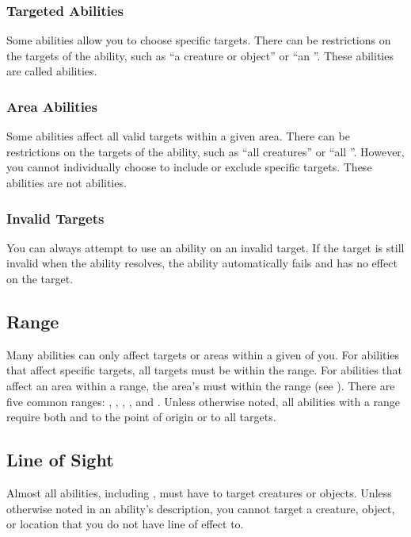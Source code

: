         \subsubsection{Targeted Abilities}\label{Targeted Abilities}
            Some abilities allow you to choose specific targets.
            There can be restrictions on the targets of the ability, such as ``a creature or object'' or ``an ''.
            These abilities are called  abilities.

        \subsubsection{Area Abilities}
            Some abilities affect all valid targets within a given area.
            There can be restrictions on the targets of the ability, such as ``all creatures'' or ``all ''.
            However, you cannot individually choose to include or exclude specific targets.
            These abilities are not  abilities.

        \subsubsection{Invalid Targets}
            You can always attempt to use an ability on an invalid target.
            If the target is still invalid when the ability resolves, the ability automatically fails and has no effect on the target.

    \subsection{Range}\label{Range}
        Many abilities can only affect targets or areas within a given  of you.
        For abilities that affect specific targets, all targets must be within the range.
        For abilities that affect an area within a range, the area's  must within the range (see ).
        There are five common ranges: \rngshort, \rngmed, \rnglong, \rngdist, and \rngext.
        Unless otherwise noted, all abilities with a range require both  and  to the point of origin or to all targets.

    \subsection{Line of Sight}\label{Line of Sight}
        Almost all abilities, including , must have  to target creatures or objects.
        Unless otherwise noted in an ability's description, you cannot target a creature, object, or location that you do not have line of effect to.

